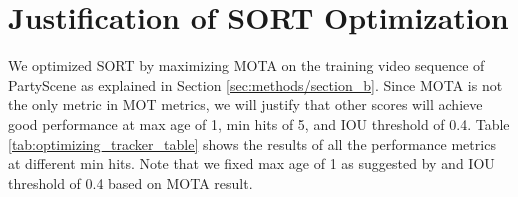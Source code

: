 \section{Justification of SORT Optimization}
\label{sec:appendix/section_a}

We optimized SORT by maximizing MOTA on the training video sequence of PartyScene as explained in Section \ref{sec:methods/section_b}. Since MOTA is not the only metric in MOT metrics, we will justify that other scores will achieve good performance at max age of 1, min hits of 5, and IOU threshold of 0.4. Table \ref{tab:optimizing_tracker_table} shows the results of all the performance metrics at different min hits. Note that we fixed max age of 1 as suggested by \cite{abewley_abewleysort_2021} and IOU threshold of 0.4 based on MOTA result.
